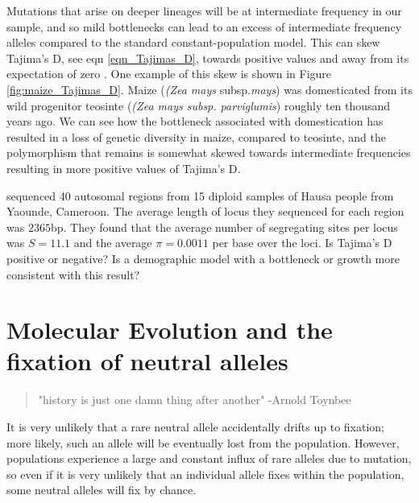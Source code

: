 Mutations that arise on deeper lineages will be at intermediate frequency in our sample, and so mild bottlenecks
can lead to an excess of intermediate frequency alleles compared to
the standard constant-population model. This can skew 
Tajima's D, see eqn \ref{eqn_Tajimas_D}, towards positive values and away from its expectation of
zero . One example of this skew is shown in Figure
\ref{fig:maize_Tajimas_D}. Maize ({\it (Zea mays} subsp.{\it mays}) was domesticated from its wild progenitor teosinte ({\it (Zea mays
subsp. parviglumis}) roughly ten thousand years ago. We can see how the
 bottleneck associated with domestication has resulted in a loss of genetic diversity in maize, compared to teosinte, and the polymorphism that remains is somewhat skewed towards intermediate frequencies resulting in more positive values of Tajima's D.

\begin{question}
\citet{voight2005interrogating} sequenced 40 autosomal regions from 15 diploid samples of Hausa people from Yaounde, Cameroon. The average length of locus they sequenced for each region was $2365$bp. They found that the average number of segregating sites per locus was $S= 11.1$ and the average $\pi = 0.0011$ per base over the loci. Is Tajima's D positive or negative? Is a demographic model with a bottleneck or growth more consistent with this result?
\end{question}





\section{Molecular Evolution and the fixation of neutral alleles} 
\begin{quote}
"history is just one damn thing after another" -Arnold Toynbee 
\end{quote} %

It is very unlikely that a rare
neutral allele accidentally drifts up to fixation; more likely, such an allele
will be eventually lost from the population. However, populations experience a
large and constant influx of rare alleles due to mutation, so even if it is
very unlikely that an individual allele fixes within the population, some
neutral alleles will fix by chance. \\



